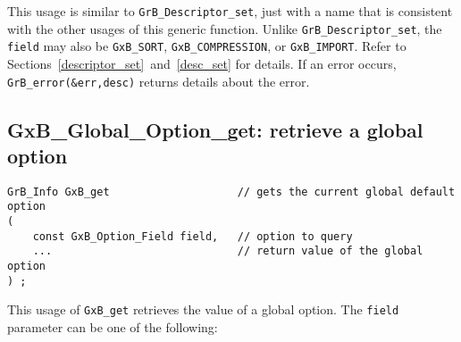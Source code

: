 \documentclass[12pt]{article}
\begin{document}
This usage is similar to \verb'GrB_Descriptor_set', just with a name that is
consistent with the other usages of this generic function.  Unlike
\verb'GrB_Descriptor_set', the \verb'field' may also be
\verb'GxB_SORT', \verb'GxB_COMPRESSION', or
\verb'GxB_IMPORT'.  Refer to Sections~\ref{descriptor_set}~and~\ref{desc_set}
for details.  If an error occurs, \verb'GrB_error(&err,desc)' returns details
about the error.

\newpage
\subsection{{\sf GxB\_Global\_Option\_get:} retrieve a global option}
\label{gxbget}

\begin{mdframed}[userdefinedwidth=6in]
{\footnotesize
\begin{verbatim}
GrB_Info GxB_get                    // gets the current global default option
(
    const GxB_Option_Field field,   // option to query
    ...                             // return value of the global option
) ;
\end{verbatim} } \end{mdframed}

This usage of \verb'GxB_get' retrieves the value of a global option.  The
\verb'field' parameter can be one of the following:
\end{document}
